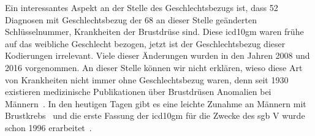 Ein interessantes Aspekt an der Stelle des Geschlechtsbezugs ist, dass 52 Diagnosen mit Geschlechtsbezug der 68 an dieser Stelle geänderten Schlüsselnummer, Krankheiten der Brustdrüse sind. Diese \ac{icd10gm} waren frühe auf das weibliche Geschlecht bezogen, jetzt ist der Geschlechtsbezug dieser Kodierungen irrelevant. Viele dieser Änderungen wurden in den Jahren 2008 und 2016 vorgenommen. An dieser Stelle können wir nicht erklären, wieso diese Art von Krankheiten nicht immer ohne Geschlechtsbezug waren, denn seit 1930 existieren medizinische Publikationen über Brustdrüsen Anomalien bei Männern~\cite{bcm}. In den heutigen Tagen gibt es eine leichte Zunahme an Männern mit Brustkrebs~\cite{giobcm} und die erste Fassung der \ac{icd10gm} für die Zwecke des \ac{sgb} V wurde schon 1996 erarbeitet~\cite{icdgmhistory}.

\clearpage

